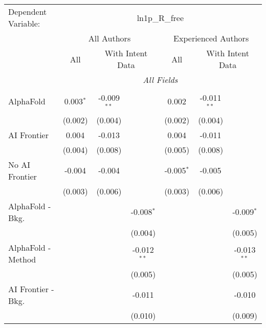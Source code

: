 \begingroup
\centering
\begin{tabular}{lcccccc}
   \tabularnewline \midrule \midrule
   Dependent Variable: & \multicolumn{6}{c}{ln1p\_R\_free}\\
 & \multicolumn{3}{c}{All Authors} & \multicolumn{3}{c}{Experienced Authors} \\
\cmidrule(lr){2-4} \cmidrule(lr){5-7}
 & \multicolumn{1}{c}{All} & \multicolumn{2}{c}{With Intent Data} & \multicolumn{1}{c}{All} & \multicolumn{2}{c}{With Intent Data} \\
\cmidrule(lr){2-2} \cmidrule(lr){3-4} \cmidrule(lr){5-5} \cmidrule(lr){6-7}
 & \multicolumn{6}{c}{\textit{All Fields}} \\ \\
   AlphaFold               & 0.003$^{*}$ & -0.009$^{**}$ &               & 0.002        & -0.011$^{**}$ &   \\   
                           & (0.002)     & (0.004)       &               & (0.002)      & (0.004)       &   \\   
   AI Frontier             & 0.004       & -0.013        &               & 0.004        & -0.011        &   \\   
                           & (0.004)     & (0.008)       &               & (0.005)      & (0.008)       &   \\   
   No AI Frontier          & -0.004      & -0.004        &               & -0.005$^{*}$ & -0.005        &   \\   
                           & (0.003)     & (0.006)       &               & (0.003)      & (0.006)       &   \\   
   AlphaFold - Bkg.        &             &               & -0.008$^{*}$  &              &               & -0.009$^{*}$\\   
                           &             &               & (0.004)       &              &               & (0.005)\\   
   AlphaFold - Method      &             &               & -0.012$^{**}$ &              &               & -0.013$^{**}$\\   
                           &             &               & (0.005)       &              &               & (0.005)\\   
   AI Frontier - Bkg.      &             &               & -0.011        &              &               & -0.010\\   
                           &             &               & (0.010)       &              &               & (0.009)\\   

\end{tabular}
